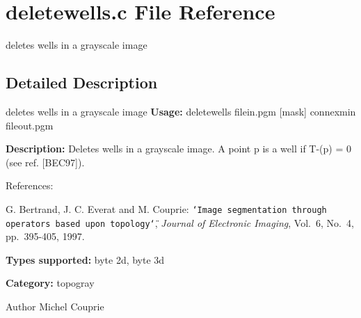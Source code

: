 \section{deletewells.c File Reference}
\label{deletewells_8c}


deletes wells in a grayscale image  




\subsection{Detailed Description}
deletes wells in a grayscale image {\bfseries Usage:} deletewells filein.pgm [mask] connexmin fileout.pgm

{\bfseries Description:} Deletes wells in a grayscale image. A point p is a well if T-\/(p) = 0 (see ref. [BEC97]).

References:\par
 [BEC97] G. Bertrand, J. C. Everat and M. Couprie: {\tt \char`\"{}Image segmentation through operators based upon topology\char`\"{}}, {\itshape  Journal of Electronic Imaging\/}, Vol.~6, No.~4, pp.~395-\/405, 1997.\par


{\bfseries Types supported:} byte 2d, byte 3d

{\bfseries Category:} topogray

\begin{DoxyAuthor}{Author}
Michel Couprie 
\end{DoxyAuthor}
